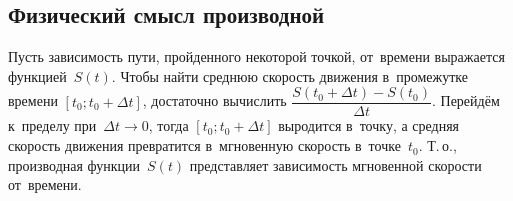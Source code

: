 \subsection{Физический смысл производной}
Пусть зависимость пути, пройденного некоторой точкой, от~времени выражается функцией~$S(t)$.
Чтобы найти среднюю скорость движения в~промежутке времени $[t_0; t_0 + \Delta t]$, достаточно вычислить $\dfrac{S(t_0 + \Delta t) - S(t_0)}{\Delta t}$.
Перейдём к~пределу при~$\Delta t \to 0$, тогда $[t_0; t_0 + \Delta t]$ выродится в~точку, а средняя скорость движения превратится в~мгновенную скорость в~точке~$t_0$.
Т.\,о., производная функции~$S(t)$ представляет зависимость мгновенной скорости от~времени.